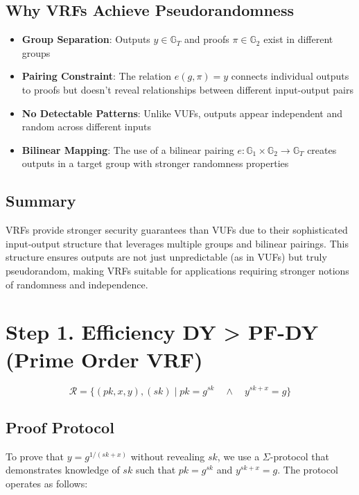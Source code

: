 \subsection{Why VRFs Achieve Pseudorandomness}
\begin{itemize}
    \item \textbf{Group Separation}: Outputs $y \in \mathbb{G}_T$ and proofs $\pi \in \mathbb{G}_2$ exist in different groups
    \item \textbf{Pairing Constraint}: The relation $e(g, \pi) = y$ connects individual outputs to proofs but doesn't reveal relationships between different input-output pairs
    \item \textbf{No Detectable Patterns}: Unlike VUFs, outputs appear independent and random across different inputs
    \item \textbf{Bilinear Mapping}: The use of a bilinear pairing $e: \mathbb{G}_1 \times \mathbb{G}_2 \rightarrow \mathbb{G}_T$ creates outputs in a target group with stronger randomness properties
\end{itemize}

\subsection{Summary}
VRFs provide stronger security guarantees than VUFs due to their sophisticated input-output structure that leverages multiple groups and bilinear pairings. This structure ensures outputs are not just unpredictable (as in VUFs) but truly pseudorandom, making VRFs suitable for applications requiring stronger notions of randomness and independence.


















\newpage
\section{Step 1. Efficiency DY > PF-DY (Prime Order VRF)}
\[
\mathcal{R} = \{(pk, x, y), (sk) \mid pk = g^{sk} \quad \wedge \quad y^{sk+x} = g\}
\]


\subsection{Proof Protocol}
To prove that $y = g^{1/(sk+x)}$ without revealing $sk$, we use a $\Sigma$-protocol that demonstrates knowledge of $sk$ such that $pk = g^{sk}$ and $y^{sk+x} = g$. The protocol operates as follows:

